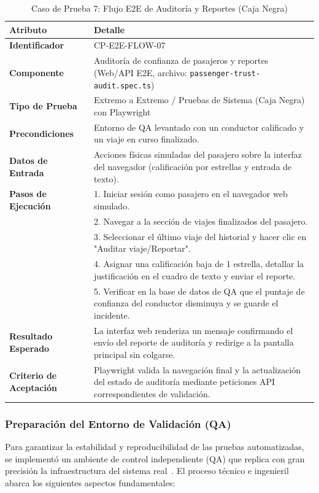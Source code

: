 \documentclass{article}
\begin{document}
\begin{table}[H]
\centering
\small
\caption{Caso de Prueba 7: Flujo E2E de Auditoría y Reportes (Caja Negra)}
\begin{tabularx}{\linewidth}{p{4cm} X}
\toprule
\textbf{Atributo} & \textbf{Detalle} \\
\midrule
\textbf{Identificador} & CP-E2E-FLOW-07 \\
\textbf{Componente} & Auditoría de confianza de pasajeros y reportes (Web/API E2E, archivo: \texttt{passenger-trust-audit.spec.ts}) \\
\textbf{Tipo de Prueba} & Extremo a Extremo / Pruebas de Sistema (Caja Negra) con Playwright \\
\textbf{Precondiciones} & Entorno de QA levantado con un conductor calificado y un viaje en curso finalizado. \\
\textbf{Datos de Entrada} & Acciones físicas simuladas del pasajero sobre la interfaz del navegador (calificación por estrellas y entrada de texto). \\
\textbf{Pasos de Ejecución} & 1. Iniciar sesión como pasajero en el navegador web simulado.\\
& 2. Navegar a la sección de viajes finalizados del pasajero.\\
& 3. Seleccionar el último viaje del historial y hacer clic en "Auditar viaje/Reportar".\\
& 4. Asignar una calificación baja de 1 estrella, detallar la justificación en el cuadro de texto y enviar el reporte.\\
& 5. Verificar en la base de datos de QA que el puntaje de confianza del conductor disminuya y se guarde el incidente.\\
\textbf{Resultado Esperado} & La interfaz web renderiza un mensaje confirmando el envío del reporte de auditoría y redirige a la pantalla principal sin colgarse. \\
\textbf{Criterio de Aceptación} & Playwright valida la navegación final y la actualización del estado de auditoría mediante peticiones API correspondientes de validación. \\
\bottomrule
\end{tabularx}
\end{table}

\subsubsection{Preparación del Entorno de Validación (QA)}

Para garantizar la estabilidad y reproducibilidad de las pruebas automatizadas, se implementó un ambiente de control independiente (QA) que replica con gran precisión la infraestructura del sistema real~\cite{dockerdocs}. El proceso técnico e ingenieril abarca los siguientes aspectos fundamentales:
\end{document}
